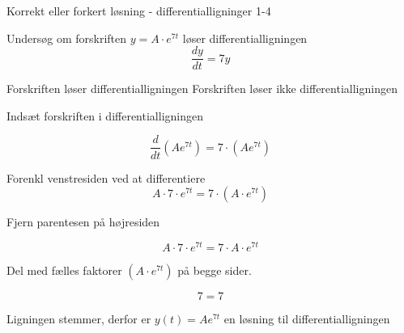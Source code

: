 \documentclass{article}
\begin{document}
\begin{exercise}{Korrekt eller forkert løsning - differentialligninger 1-4}
	
	
	Undersøg om forskriften $y = A \cdot e^{7t}$ løser differentialligningen
	\[
	\frac{dy}{dt} = 7y
	\]
	
\begin{multichoice}
	\itemtrue Forskriften løser differentialligningen 
	\itemfalse Forskriften løser ikke differentialligningen 
\end{multichoice}
	\hint
	
	Indsæt forskriften i differentialligningen
	
	\hint
	\[
	\frac{d}{dt} \left( A e^{7t}\right) = 7 \cdot \left( A e^{7t} \right)
	\]
	
	
	\hint
	
	Forenkl venstresiden ved at differentiere
	\[
	A \cdot 7 \cdot e^{7t} = 7 \cdot \left(A \cdot e^{7t} \right)
	\]
	
	\hint
	
	Fjern parentesen på højresiden
	
	\hint
	\[
	A \cdot 7 \cdot e^{7t} = 7 \cdot A \cdot e^{7t}
	\]
	
	\hint
	Del med fælles faktorer $\left( A \cdot e^{7t} \right)$ på begge sider.
	
	\hint
	
	\[
	7 = 7
	\]
	
	
	\hint
	
	Ligningen stemmer, derfor er $y(t) = A e^{7t}$ en løsning til differentialligningen
	
\end{exercise}

\newpage
\end{document}
